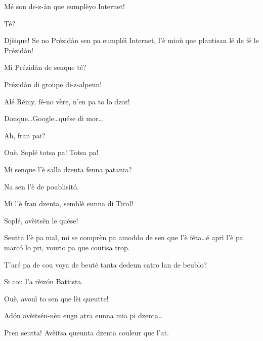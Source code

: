 \begin{drama}
\Battistaspeaks{}  Mé son de-z-àn que eumplèyo Internet!

\Cesarspeaks{} Té?

\Cesarspeaks Djèique! Se no Prézidàn sen pa eumpléì Internet, l’è mioù que plantisan lé de fé le Prézidàn!

\Hermannspeaks Mi Prézidàn de senque té?

\Battistaspeaks  Prézidàn di groupe di-z-alpeun!


\Cesarspeaks Alé Rémy, fé-no vère, n'en pa to lo dzor! 


\Remyspeaks{} Donque\ldots Google\ldots quése di mor\ldots

\Cesarspeaks{} Ah, fran pai?

\Remyspeaks Ouè.  Soplé totsa pa! Totsa pa!

\Hermannspeaks Mi senque l'è salla dzenta fenna patania?

\Remyspeaks Na sen l'è de poublisit\'o.

\Hermannspeaks Mi l'è fran dzenta, semblè eunna di Tirol!

\Remyspeaks Soplé, avèitsèn le quése!

\Cesarspeaks Seutta l'è pa mal, mi se comprèn pa amoddo de sen que l'è féta\ldots é aprì l'è pa marc\'o lo pri, vourio pa que coutisa trop.

\Battistaspeaks{}  T’aré pa de cou voya de beuté tanta dedeun catro lan de beublo?

\Hermannspeaks Si cou l’a rèiz\'on Battista.

\Battistaspeaks Ouè, avouì to sen que lèi queutte!


\Cesarspeaks Ad\'on avèitsén-nèn eugn atra eunna mia pi dzenta\ldots


\Hermannspeaks Pren seutta! Avèitsa queunta dzenta couleur que l'at.


\end{drama}
